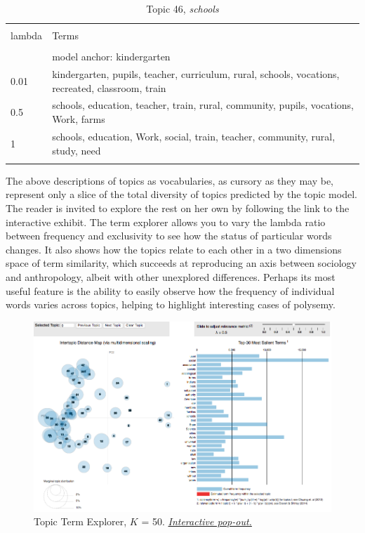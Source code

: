 \documentclass[]{book}
\theoremstyle{definition}
\theoremstyle{definition}
\theoremstyle{definition}
\theoremstyle{remark}
\begin{document}
\begin{table}[!htbp] \centering 
  \caption{Topic 46, \emph{schools}} 
  \label{tab:t46-h} 
\begin{tabularx}{\textwidth}{@{\extracolsep{5pt}} lY} 
\\[-1.8ex]\hline 
\hline \\[-1.8ex] 
lambda & Terms \\ 
\hline \\[-1.8ex] 
 & model anchor: kindergarten \\ 
0.01 & kindergarten, pupils, teacher, curriculum, rural, schools, vocations, recreated, classroom, train \\ 
0.5 & schools, education, teacher, train, rural, community, pupils, vocations, Work, farms \\ 
1 & schools, education, Work, social, train, teacher, community, rural, study, need \\ 
\hline \\[-1.8ex] 
\end{tabularx} 
\end{table}

The above descriptions of topics as vocabularies, as cursory as they may
be, represent only a slice of the total diversity of topics predicted by
the topic model. The reader is invited to explore the rest on her own by
following the link to the interactive exhibit. The term explorer allows
you to vary the lambda ratio between frequency and exclusivity to see
how the status of particular words changes. It also shows how the topics
relate to each other in a two dimensions space of term similarity, which
succeeds at reproducing an axis between sociology and anthropology,
albeit with other unexplored differences. Perhaps its most useful
feature is the ability to easily observe how the frequency of individual
words varies across topics, helping to highlight interesting cases of
polysemy.





\begin{figure}

{\centering \includegraphics[width=0.9\linewidth]{img/soc-mod-viz} 

}

\caption{Topic Term Explorer, \(K\) = 50.
\href{https://brooksambrose.github.io/portfolio/exh/viz/index.html}{\emph{Interactive
pop-out.}}}\label{fig:soc-mod-viz}
\end{figure}
\end{document}
